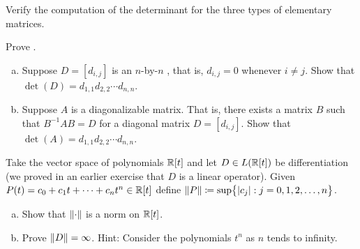 \begin{exercise}
Verify the computation of the determinant for the three types of 
elementary matrices.
\end{exercise}

\begin{exercise}
Prove .
\end{exercise}

\begin{exercise}
\leavevmode
\begin{enumerate}[a)]
\item
Suppose $D = [d_{i,j}]$ is an $n$-by-$n$ \emph{}, that is, $d_{i,j} = 0$ whenever $i
\not= j$.  Show that $\det(D) = d_{1,1}d_{2,2} \cdots d_{n,n}$.
\item
Suppose $A$ is a diagonalizable matrix.  That is, there exists a matrix
$B$ such that $B^{-1}AB = D$ for a diagonal matrix $D = [d_{i,j}]$.  Show
that $\det(A) = d_{1,1}d_{2,2} \cdots d_{n,n}$.
\end{enumerate}
\end{exercise}

\begin{exercise}
\pagebreak[1]
Take the vector space of polynomials ${\mathbb{R}}[t]$ and let $D \in L({\mathbb{R}}[t])$ be
differentiation (we proved in an earlier exercise that $D$ is a linear
operator).  Given $P(t) = c_0 + c_1 t + \cdots + c_n
t^n \in {\mathbb{R}}[t]$ define $\lVert {P} \rVert \coloneqq \sup \bigl\{ \lvert {c_j} \rvert : j = 0,1,2,\ldots,n \bigr\}$.
\begin{enumerate}[a)]
\item
Show that $\lVert {\cdot} \rVert$ is a norm on ${\mathbb{R}}[t]$.
\item
Prove $\lVert {D} \rVert = \infty$.  Hint: Consider the polynomials $t^n$ as $n$ tends to infinity.
\end{enumerate}
\end{exercise}

